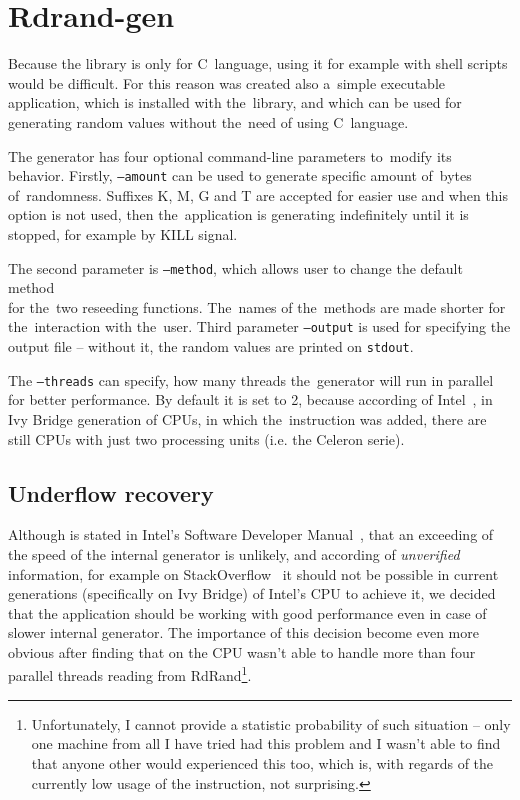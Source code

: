 
\chapter{Rdrand-gen} \label{chap:generator}

Because the library is only for C~language, using it for example with shell scripts would be difficult. For this reason was created also a~simple executable application, which is installed with the~library, and which can be used for generating random values without the~need of using C~language.

The generator has four optional command-line parameters to~modify its behavior. Firstly, {\tt --amount} can be used to generate specific amount of~bytes of~randomness. Suffixes K, M, G and T are accepted for easier use and when this option is not used, then the~application is generating indefinitely until it is stopped, for example by KILL signal.

The second parameter is {\tt --method}, which allows user to change the default method \\ for the~two reseeding functions. The~names of the~methods are made shorter for the~interaction with the~user. Third parameter {\tt --output} is used for specifying the output file -- without it, the random values are printed on {\tt stdout}. 

The {\tt --threads} can specify, how many threads the~generator will run in parallel for better performance. By default it is set to 2, because according of Intel~\cite{IntelArk}, in Ivy Bridge generation of CPUs, in which the~instruction was added, there are still CPUs with just two processing units (i.e. the Celeron serie).

\section{Underflow recovery}
Although is stated in Intel's Software Developer Manual~\cite[chapter~7.3.17]{IntelSWManualVol1}, that an exceeding of the speed of the internal generator is unlikely, and according of {\em unverified} information, for example on StackOverflow~\cite{StackoverflowRDRANDCharacteristics} it should not be possible in current generations (specifically on Ivy Bridge) of Intel's CPU to achieve it, we decided that the application should be working with good performance even in case of slower internal generator. The importance of this decision become even more obvious after finding that on  the CPU wasn't able to handle more than four parallel threads reading from RdRand\footnote{Unfortunately, I cannot provide a statistic probability of such situation -- only one machine from all I have tried had this problem and I wasn't able to find that anyone other would experienced this too, which is, with regards of the currently low usage of the instruction, not surprising.}.

